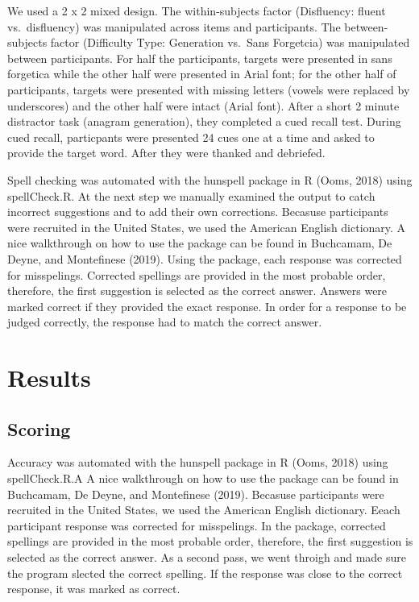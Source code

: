 \documentclass[pdf]{apa6}
\begin{document}
We used a 2 x 2 mixed design. The within-subjects factor (Disfluency: fluent vs.~disfluency) was manipulated across items and participants. The between-subjects factor (Difficulty Type: Generation vs.~Sans Forgetcia) was manipulated between participants. For half the participants, targets were presented in sans forgetica while the other half were presented in Arial font; for the other half of participants, targets were presented with missing letters (vowels were replaced by underscores) and the other half were intact (Arial font). After a short 2 minute distractor task (anagram generation), they completed a cued recall test. During cued recall, particpants were presented 24 cues one at a time and asked to provide the target word. After they were thanked and debriefed.

Spell checking was automated with the hunspell package in R (Ooms, 2018) using spellCheck.R. At the next step we manually examined the output to catch incorrect suggestions and to add their own corrections. Becasuse participants were recruited in the United States, we used the American English dictionary. A nice walkthrough on how to use the package can be found in Buchcamam, De Deyne, and Montefinese (2019). Using the package, each response was corrected for misspelings. Corrected spellings are provided in the most probable order, therefore, the first suggestion is selected as the correct answer. Answers were marked correct if they provided the exact response. In order for a response to be judged correctly, the response had to match the correct answer.

\hypertarget{results}{%
\section{Results}\label{results}}

\hypertarget{scoring}{%
\subsection{Scoring}\label{scoring}}

Accuracy was automated with the hunspell package in R (Ooms, 2018) using spellCheck.R.A A nice walkthrough on how to use the package can be found in Buchcamam, De Deyne, and Montefinese (2019). Becasuse participants were recruited in the United States, we used the American English dictionary. Eeach participant response was corrected for misspelings. In the package, corrected spellings are provided in the most probable order, therefore, the first suggestion is selected as the correct answer. As a second pass, we went throigh and made sure the program slected the correct spelling. If the response was close to the correct response, it was marked as correct.
\end{document}
